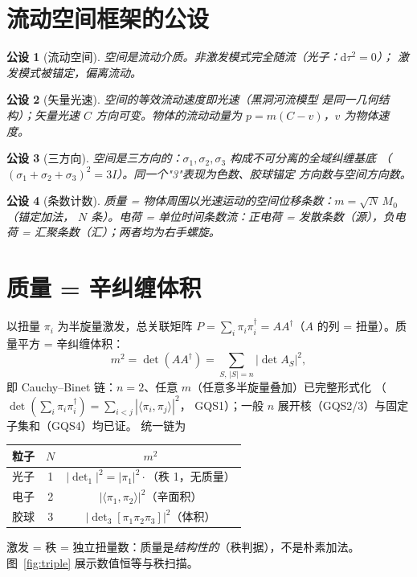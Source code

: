 \documentclass[aps,prd,preprint,superscriptaddress,amsmath,amssymb]{revtex4-2}
\newtheorem{postulate}{公设}[section]
\begin{document}
\section{流动空间框架的公设}
\label{sec:postulates}

\begin{postulate}[流动空间]
空间是流动介质。非激发模式完全随流（光子：$\mathrm d\tau^2=0$）；
激发模式被锚定，偏离流动。
\end{postulate}

\begin{postulate}[矢量光速]
空间的等效流动速度即光速（黑洞河流模型\cite{hamilton2008river} 是同一几何结构）；矢量光速 $C$ 方向可变。物体的流动动量为
$p = m(C-v)$，$v$ 为物体速度。
\end{postulate}

\begin{postulate}[三方向]
空间是三方向的：$\sigma_1,\sigma_2,\sigma_3$ 构成不可分离的全域纠缠基底
（$(\sigma_1+\sigma_2+\sigma_3)^2=3I$）。同一个"3"表现为色数、胶球锚定
方向数与空间方向数。
\end{postulate}

\begin{postulate}[条数计数]
质量 = 物体周围以光速运动的空间位移条数：$m=\sqrt{N}\,M_0$（锚定加法，
$N$ 条）。电荷 = 单位时间条数流：正电荷 = 发散条数（源），负电荷 =
汇聚条数（汇）；两者均为右手螺旋。
\end{postulate}

\section{质量 = 辛纠缠体积}
\label{sec:mass}

以扭量 $\pi_i$ 为半旋量激发\cite{penrose1967twistor}，总关联矩阵 $P = \sum_i \pi_i\pi_i^\dagger
= AA^\dagger$（$A$ 的列 = 扭量）。质量平方 = 辛纠缠体积：
\begin{equation}
m^2 = \det(AA^\dagger) = \sum_{S,\,|S|=n} \big|\det A_S\big|^2 ,
\label{eq:cauchy}
\end{equation}
即 Cauchy--Binet 链：$n=2$、任意 $m$（任意多半旋量叠加）已完整形式化\cite{de2015lean}
（$\det(\sum_i \pi_i\pi_i^\dagger)=\sum_{i<j}|\langle\pi_i,\pi_j\rangle|^2$，
GQS1）；一般 $n$ 展开核（GQS2/3）与固定子集和（GQS4）均已证。
统一链为
\begin{center}
\begin{tabular}{lcc}
\toprule
粒子 & $N$ & $m^2$ \\
\midrule
光子 & 1 & $|\det_1|^2 = |\pi_1|^2 \cdot$（秩 1，无质量） \\
电子 & 2 & $|\langle\pi_1,\pi_2\rangle|^2$（辛面积） \\
胶球 & 3 & $|\det_3[\pi_1\pi_2\pi_3]|^2$（体积） \\
\bottomrule
\end{tabular}
\end{center}
激发 = 秩 = 独立扭量数：质量是\emph{结构性的}（秩判据），不是朴素加法。
图~\ref{fig:triple} 展示数值恒等与秩扫描。
\end{document}
